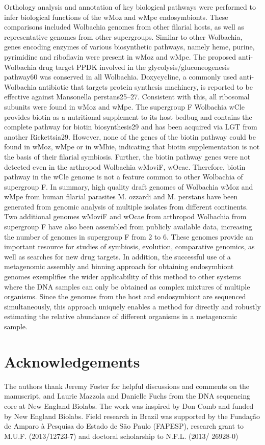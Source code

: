 \documentclass[10pt, a4paper, twocolumn]{article} %
\begin{document}
Orthology analysis and annotation of key biological pathways were performed to infer biological functions of the wMoz and wMpe endosymbionts. These comparisons included Wolbachia genomes from other filarial hosts, as well as representative genomes from other supergroups. Similar to other Wolbachia, genes encoding enzymes of various biosynthetic pathways, namely heme, purine, pyrimidine and riboflavin were present in wMoz and wMpe. The proposed anti-Wolbachia drug target PPDK involved in the glycolysis/gluconeogenesis pathway60 was conserved in all Wolbachia. Doxycycline, a commonly used anti-Wolbachia antibiotic that targets protein synthesis machinery, is reported to be effective against Mansonella perstans25–27. Consistent with this, all ribosomal subunits were found in wMoz and wMpe. 
The supergroup F Wolbachia wCle provides biotin as a nutritional supplement to its host bedbug and contains the complete pathway for biotin biosynthesis29 and has been acquired via LGT from another Rickettsia29. However, none of the genes of the biotin pathway could be found in wMoz, wMpe or in wMhie, indicating that biotin supplementation is not the basis of their filarial symbiosis. Further, the biotin pathway genes were not detected even in the arthropod Wolbachia wMoviF, wOcae.  Therefore, biotin pathway in the wCle genome is not a feature common to other Wolbachia of supergroup F.
In summary, high quality draft genomes of Wolbachia wMoz and wMpe from human filarial parasites M. ozzardi and M. perstans have been generated from genomic analysis of multiple isolates from different continents. Two additional genomes wMoviF and wOcae from arthropod Wolbachia from supergroup F have also been assembled from publicly available data, increasing the number of genomes in supergroup F from 2 to 6. These genomes provide an important resource for studies of symbiosis, evolution, comparative genomics, as well as searches for new drug targets. In addition, the successful use of a metagenomic assembly and binning approach for obtaining endosymbiont genomes exemplifies the wider applicability of this method to other systems where the DNA samples can only be obtained as complex mixtures of multiple organisms. Since the genomes from the host and endosymbiont are sequenced simultaneously, this approach uniquely enables a method for directly and robustly estimating the relative abundance of different organisms in a metagenomic sample. 

\section{Acknowledgements}
The authors thank Jeremy Foster for helpful discussions and comments on the manuscript, and Laurie Mazzola and Danielle Fuchs from the DNA sequencing core at New England Biolabs. The work was inspired by Don Comb and funded by New England Biolabs. Field research in Brazil was supported by the Fundação de Amparo à Pesquisa do Estado de São Paulo (FAPESP), research grant to M.U.F. (2013/12723-7) and doctoral scholarship to N.F.L. (2013/ 26928-0)
\end{document}
